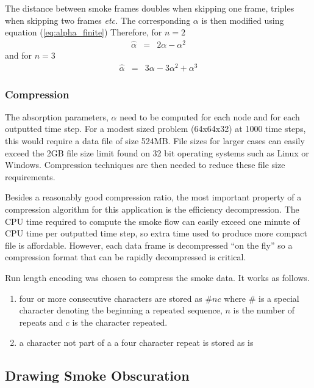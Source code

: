 The distance between smoke frames doubles when skipping one frame,
triples when skipping two frames {\em etc.} The corresponding
$\alpha$ is then modified using equation (\ref{eq:alpha_finite})
Therefore, for $n=2$
\begin{eqnarray*}
\hat{\alpha}&=&2\alpha-\alpha^2
\end{eqnarray*}
and for $n=3$
\begin{eqnarray*}
\hat{\alpha}&=&3\alpha-3\alpha^2+\alpha^3
\end{eqnarray*}
\subsubsection{Compression} The absorption parameters, $\alpha$
need to be computed for each node and for each outputted time
step. For a modest sized problem (64x64x32) at 1000 time steps,
this would require a data file of size 524MB.  File sizes for
larger cases can easily exceed the 2GB file size limit found on 32
bit operating systems such as Linux or Windows.  Compression
techniques are then needed to reduce these file size requirements.

Besides a reasonably good compression ratio, the most important
property of a compression algorithm for this application is the
efficiency decompression.  The CPU time required to compute the
smoke flow can easily exceed one minute of CPU time per outputted
time step, so extra time used to produce more compact file is
affordable. However, each data frame is decompressed ``on the
fly'' so a compression format that can be rapidly decompressed is
critical.

Run length encoding was chosen to compress the smoke data. It
works as follows.

\begin{enumerate}
\item four or more consecutive characters are stored as $\# n c$
where $\#$ is a special character denoting the beginning a
repeated sequence, $n$ is the number of repeats and $c$ is the
character repeated. \item a character not part of a a four
character repeat is stored as is
\end{enumerate}


\label{section:graphics}
\subsection{Drawing Smoke Obscuration}
